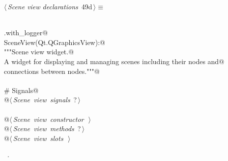 \documentclass[
    a4paper,      %
    10pt,         %
    openright,    %
    notitlepage,  %
    parskip=half, %
]{scrreprt}       %
\theoremstyle{definition}                    %
\begin{document}
\begin{flushleft} \small
\begin{minipage}{\linewidth}\label{scrap72}\raggedright\small
{} $\langle\,${\itshape Scene view declarations}\nobreak\ {\footnotesize {49d}}$\,\rangle\equiv$
\vspace{-1ex}
\begin{list}{}{} \item
\mbox{}\lstinline@@\\
\mbox{}\lstinline@common.with_logger@\\
\mbox{}\lstinline@class SceneView(Qt.QGraphicsView):@\\
\mbox{}\lstinline@    """Scene view widget.@\\
\mbox{}\lstinline@    A widget for displaying and managing scenes including their nodes and@\\
\mbox{}\lstinline@    connections between nodes."""@\\
\mbox{}\lstinline@@\\
\mbox{}\lstinline@    # Signals@\\
\mbox{}\lstinline@    @\hbox{$\langle\,${\itshape Scene view signals}\nobreak\ {\footnotesize ?}$\,\rangle$}\lstinline@@\\
\mbox{}\lstinline@@\\
\mbox{}\lstinline@    @\hbox{$\langle\,${\itshape Scene view constructor}\nobreak\ {\footnotesize {}}$\,\rangle$}\lstinline@@\\
\mbox{}\lstinline@    @\hbox{$\langle\,${\itshape Scene view methods}\nobreak\ {\footnotesize ?}$\,\rangle$}\lstinline@@\\
\mbox{}\lstinline@    @\hbox{$\langle\,${\itshape Scene view slots}\nobreak\ {\footnotesize {}}$\,\rangle$}\lstinline@@\\
\mbox{}\lstinline@@{\NWsep}
\end{list}
\vspace{-1.5ex}
\footnotesize
\begin{list}{}{\setlength{\itemsep}{-\parsep}\setlength{\itemindent}{-\leftmargin}}
\item \NWtxtMacroRefIn\ .

\item{}
\end{list}
\end{minipage}\vspace{4ex}
\end{flushleft}
\end{document}
